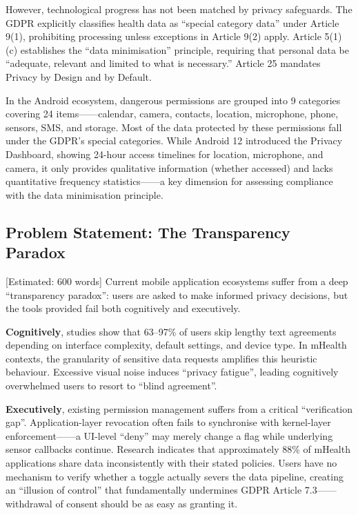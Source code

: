 However, technological progress has not been matched by privacy safeguards. The GDPR explicitly classifies health data as ``special category data'' under Article 9(1), prohibiting processing unless exceptions in Article 9(2) apply. Article 5(1)(c) establishes the ``data minimisation'' principle, requiring that personal data be ``adequate, relevant and limited to what is necessary.'' Article 25 mandates Privacy by Design and by Default.

In the Android ecosystem, dangerous permissions are grouped into 9 categories covering 24 items——calendar, camera, contacts, location, microphone, phone, sensors, SMS, and storage. Most of the data protected by these permissions fall under the GDPR's special categories. While Android 12 introduced the Privacy Dashboard, showing 24-hour access timelines for location, microphone, and camera, it only provides qualitative information (whether accessed) and lacks quantitative frequency statistics——a key dimension for assessing compliance with the data minimisation principle.

\subsection{Problem Statement: The Transparency Paradox} [Estimated: 600 words]
Current mobile application ecosystems suffer from a deep ``transparency paradox'': users are asked to make informed privacy decisions, but the tools provided fail both cognitively and executively.

\textbf{Cognitively}, studies show that 63--97\% of users skip lengthy text agreements depending on interface complexity, default settings, and device type. In mHealth contexts, the granularity of sensitive data requests amplifies this heuristic behaviour. Excessive visual noise induces ``privacy fatigue'', leading cognitively overwhelmed users to resort to ``blind agreement''.

\textbf{Executively}, existing permission management suffers from a critical ``verification gap''. Application-layer revocation often fails to synchronise with kernel-layer enforcement——a UI-level ``deny'' may merely change a flag while underlying sensor callbacks continue. Research indicates that approximately 88\% of mHealth applications share data inconsistently with their stated policies. Users have no mechanism to verify whether a toggle actually severs the data pipeline, creating an ``illusion of control'' that fundamentally undermines GDPR Article 7.3——withdrawal of consent should be as easy as granting it.

